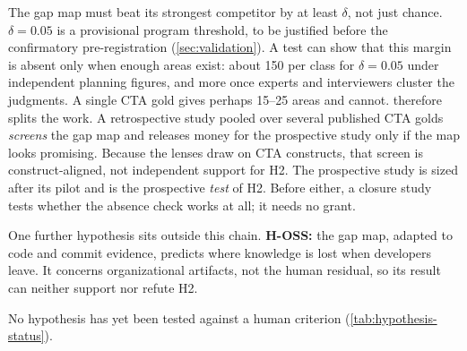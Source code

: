 The gap map must beat its strongest competitor by at least $\delta$, not just chance. $\delta = 0.05$ is
a provisional program threshold, to be justified before the confirmatory pre-registration
(\cref{sec:validation}). A test can show that this margin is absent only when enough areas exist:
about 150 per class for $\delta = 0.05$ under independent planning figures, and more once experts and
interviewers cluster the judgments. A single CTA gold gives perhaps 15--25 areas and cannot.
 therefore splits the work. A retrospective study pooled over several published
CTA golds \emph{screens} the gap map and releases money for the prospective study only if the map looks
promising. Because the lenses draw on CTA constructs, that screen is construct-aligned, not independent
support for H2. The prospective study is sized after its pilot and is the prospective \emph{test} of H2.
Before either, a closure study tests whether the absence check works at all; it needs no grant.

\evhyp{} One further hypothesis sits outside this chain. \textbf{H-OSS:} the gap map, adapted to
code and commit evidence, predicts where knowledge is lost when developers leave. It concerns
organizational artifacts, not the human residual, so its result can neither support nor refute
H2.

No hypothesis has yet been tested against a human criterion (\cref{tab:hypothesis-status}).


